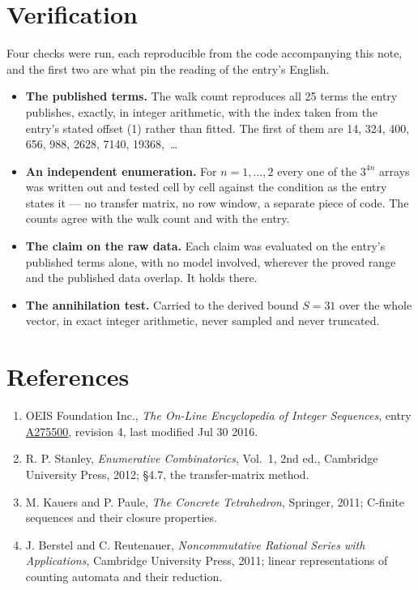 \documentclass[11pt]{article}
\theoremstyle{definition}
\begin{document}
\section{Verification}

Four checks were run, each reproducible from the code accompanying this note, and the first two are what pin the reading of the entry's English.

\begin{itemize}

\item {\bfseries The published terms.} The walk count reproduces all 25 terms the entry publishes, exactly, in integer arithmetic, with the index taken from the entry's stated offset (1) rather than fitted. The first of them are 14, 324, 400, 656, 988, 2628, 7140, 19368,~\dots

\item {\bfseries An independent enumeration.} For $n = 1,\dots,2$ every one of the $3^{4n}$ arrays was written out and tested cell by cell against the condition as the entry states it --- no transfer matrix, no row window, a separate piece of code. The counts agree with the walk count and with the entry.

\item {\bfseries The claim on the raw data.} Each claim was evaluated on the entry's published terms alone, with no model involved, wherever the proved range and the published data overlap. It holds there.

\item {\bfseries The annihilation test.} Carried to the derived bound $S = 31$ over the whole vector, in exact integer arithmetic, never sampled and never truncated.

\end{itemize}

\section{References}

\begin{enumerate}

\item OEIS Foundation Inc., \emph{The On-Line Encyclopedia of Integer Sequences}, entry \href{https://oeis.org/A275500}{A275500}, revision 4, last modified Jul 30 2016.

\item R. P. Stanley, \emph{Enumerative Combinatorics}, Vol.~1, 2nd ed., Cambridge University Press, 2012; \S4.7, the transfer-matrix method.

\item M. Kauers and P. Paule, \emph{The Concrete Tetrahedron}, Springer, 2011; C-finite sequences and their closure properties.

\item J. Berstel and C. Reutenauer, \emph{Noncommutative Rational Series with Applications}, Cambridge University Press, 2011; linear representations of counting automata and their reduction.

\end{enumerate}
\end{document}
